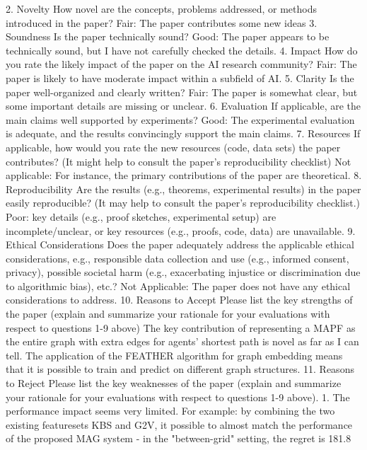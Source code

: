 2. {Novelty} How novel are the concepts, problems addressed, or methods introduced in the paper?
Fair: The paper contributes some new ideas
3. {Soundness} Is the paper technically sound?
Good: The paper appears to be technically sound, but I have not carefully checked the details.
4. {Impact} How do you rate the likely impact of the paper on the AI research community?
Fair: The paper is likely to have moderate impact within a subfield of AI.
5. {Clarity} Is the paper well-organized and clearly written?
Fair: The paper is somewhat clear, but some important details are missing or unclear.
6. {Evaluation} If applicable, are the main claims well supported by experiments?
Good: The experimental evaluation is adequate, and the results convincingly support the main claims.
7. {Resources} If applicable, how would you rate the new resources (code, data sets) the paper contributes? (It might help to consult the paper’s reproducibility checklist)
Not applicable: For instance, the primary contributions of the paper are theoretical.
8. {Reproducibility} Are the results (e.g., theorems, experimental results) in the paper easily reproducible? (It may help to consult the paper’s reproducibility checklist.)
Poor: key details (e.g., proof sketches, experimental setup) are incomplete/unclear, or key resources (e.g., proofs, code, data) are unavailable.
9. {Ethical Considerations} Does the paper adequately address the applicable ethical considerations, e.g., responsible data collection and use (e.g., informed consent, privacy), possible societal harm (e.g., exacerbating injustice or discrimination due to algorithmic bias), etc.?
Not Applicable: The paper does not have any ethical considerations to address.
10. {Reasons to Accept} Please list the key strengths of the paper (explain and summarize your rationale for your evaluations with respect to questions 1-9 above)
The key contribution of representing a MAPF as the entire graph with extra edges for agents' shortest path is novel as far as I can tell. The application of the FEATHER algorithm for graph embedding means that it is possible to train and predict on different graph structures.
11. {Reasons to Reject} Please list the key weaknesses of the paper (explain and summarize your rationale for your evaluations with respect to questions 1-9 above).
1. The performance impact seems very limited. For example: by combining the two existing featuresets KBS and G2V, it possible to almost match the performance of the proposed MAG system - in the "between-grid" setting, the regret is 181.8%


